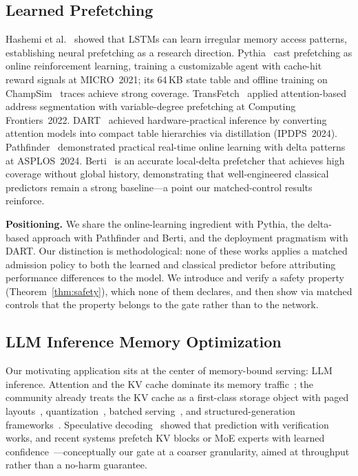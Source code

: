 \documentclass[conference]{IEEEtran}
\begin{document}
\subsection{Learned Prefetching}

Hashemi et al.~\cite{hashemi2018} showed that LSTMs can learn irregular
memory access patterns, establishing neural prefetching as a research
direction. Pythia~\cite{pythia} cast prefetching as online reinforcement
learning, training a customizable agent with cache-hit reward signals at
MICRO~2021; its 64\,KB state table and offline training on
ChampSim~\cite{champsim} traces achieve strong coverage.
TransFetch~\cite{transfetch} applied attention-based address segmentation
with variable-degree prefetching at Computing Frontiers~2022.
DART~\cite{dart} achieved hardware-practical inference by converting
attention models into compact table hierarchies via distillation
(IPDPS~2024). Pathfinder~\cite{pathfinder} demonstrated practical real-time
online learning with delta patterns at ASPLOS~2024.
Berti~\cite{berti} is an accurate local-delta prefetcher that achieves
high coverage without global history, demonstrating that well-engineered
classical predictors remain a strong baseline---a point our
matched-control results reinforce.

\textbf{Positioning.} We share the online-learning ingredient with Pythia,
the delta-based approach with Pathfinder and Berti, and the deployment
pragmatism with DART. Our distinction is methodological: none of these works
applies a matched admission policy to both the learned and classical
predictor before attributing performance differences to the model. We
introduce and verify a safety property (Theorem~\ref{thm:safety}), which
none of them declares, and then show via matched controls that the property
belongs to the gate rather than to the network.

\subsection{LLM Inference Memory Optimization}

Our motivating application sits at the center of memory-bound serving: LLM
inference. Attention and the KV cache dominate its memory
traffic~\cite{pope2023,kwon2023vllm}; the community already treats the KV
cache as a first-class storage object with paged
layouts~\cite{kwon2023vllm,kvcache_streamed}, quantization~\cite{kvcache_quant},
batched serving~\cite{orca,sarathi}, and structured-generation
frameworks~\cite{sglang}. Speculative
decoding~\cite{leviathan2023} showed that prediction with verification
works, and recent systems prefetch KV blocks or MoE experts with learned
confidence~\cite{kvcache_lookahead,apex,kvcache_moe}---conceptually our
gate at a coarser granularity, aimed at throughput rather than a no-harm
guarantee.
\end{document}
